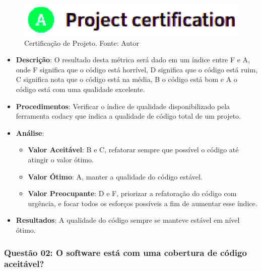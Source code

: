 
\begin{figure}[H]
	\centering
  \includegraphics[keepaspectratio=true,scale=0.8]{figuras/certificado.eps}
  \caption[Certificação de Projeto.]{Certificação de Projeto. Fonte: Autor}
	\label{fig:certificacao}
\end{figure}

\begin{itemize}
  \item \textbf{Descrição}: O resultado desta métrica será dado em um índice entre F e A, onde F significa que o código está horrível, D significa que o código está ruim, C significa nota que o código está na média, B o código está bom e A o código está com uma qualidade excelente.
  \item \textbf{Procedimentos}: Verificar o índice de qualidade disponibilizado pela ferramenta codacy que indica a qualidade de código total de um projeto.
  \item \textbf{Análise}:
    \begin{itemize}
      \item \textbf{Valor Aceitável}: B e C, refatorar sempre que possível o código até atingir o valor ótimo.
      \item \textbf{Valor Ótimo}: A, manter a qualidade do código estável.
      \item \textbf{Valor Preocupante}: D e F, priorizar a refatoração do código com urgência, e focar todos os esforços possíveis a fim de aumentar esse índice.
    \end{itemize}
  \item \textbf{Resultados}: A qualidade do código sempre se manteve estável em nível ótimo.
\end{itemize}

\subsubsection{Questão 02: O software está com uma cobertura de código aceitável?}


